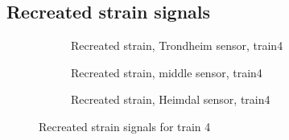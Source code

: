 \subsection{Recreated strain signals}
\begin{figure}[htpb]
  \begin{subfigure}[t]{0.9\textwidth}
    \centering
    
    \caption{Recreated strain, Trondheim sensor, train4} %
    \label{recreated_sensor_trond_train4}
  \end{subfigure}
%
  \begin{subfigure}[t]{0.9\textwidth}
    \centering
    
    \caption{Recreated strain, middle sensor, train4} %
    \label{recreated_sensor_middle_train4}
  \end{subfigure}
%
  \begin{subfigure}[t]{0.9\textwidth}
    \centering
    
    \caption{Recreated strain, Heimdal sensor, train4} %
    \label{recreated_sensor_heimdal_train4}
  \end{subfigure}
%
  \caption{Recreated strain signals for train 4}
  \label{fig:recreated_strains_train4}
\end{figure}


